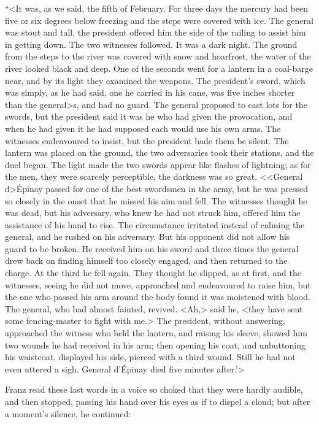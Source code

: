  “<It was, as we said, the fifth of February. For three days the mercury had been five or six degrees below freezing and the steps were covered with ice. The general was stout and tall, the president offered him the side of the railing to assist him in getting down. The two witnesses followed. It was a dark night. The ground from the steps to the river was covered with snow and hoarfrost, the water of the river looked black and deep. One of the seconds went for a lantern in a coal-barge near, and by its light they examined the weapons. The president's sword, which was simply, as he had said, one he carried in his cane, was five inches shorter than the general>s, and had no guard. The general proposed to cast lots for the swords, but the president said it was he who had given the provocation, and when he had given it he had supposed each would use his own arms. The witnesses endeavoured to insist, but the president bade them be silent. The lantern was placed on the ground, the two adversaries took their stations, and the duel began. The light made the two swords appear like flashes of lightning; as for the men, they were scarcely perceptible, the darkness was so great.  <<General d>Épinay passed for one of the best swordsmen in the army, but he was pressed so closely in the onset that he missed his aim and fell. The witnesses thought he was dead, but his adversary, who knew he had not struck him, offered him the assistance of his hand to rise. The circumstance irritated instead of calming the general, and he rushed on his adversary. But his opponent did not allow his guard to be broken. He received him on his sword and three times the general drew back on finding himself too closely engaged, and then returned to the charge. At the third he fell again. They thought he slipped, as at first, and the witnesses, seeing he did not move, approached and endeavoured to raise him, but the one who passed his arm around the body found it was moistened with blood. The general, who had almost fainted, revived. <Ah,> said he, <they have sent some fencing-master to fight with me.> The president, without answering, approached the witness who held the lantern, and raising his sleeve, showed him two wounds he had received in his arm; then opening his coat, and unbuttoning his waistcoat, displayed his side, pierced with a third wound. Still he had not even uttered a sigh. General d'Épinay died five minutes after.'> 

 Franz read these last words in a voice so choked that they were hardly audible, and then stopped, passing his hand over his eyes as if to dispel a cloud; but after a moment's silence, he continued: 

